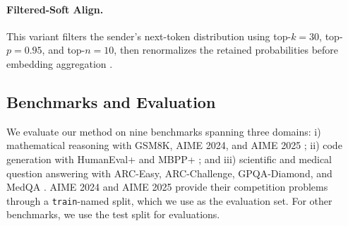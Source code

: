 \documentclass[11pt]{article}
\begin{document}
\paragraph{Filtered-Soft Align.}
This variant filters the sender's next-token distribution using top-$k=30$, top-$p=0.95$, and top-$n=10$, then renormalizes the retained probabilities before embedding aggregation \citep{soft_thinking}.

\subsection{Benchmarks and Evaluation}
We evaluate our method on nine benchmarks spanning three domains: i) mathematical reasoning with GSM8K, AIME 2024, and AIME 2025 \citep{gsm8k,aime2024,aime2025}; ii) code generation with HumanEval+ and MBPP+ \citep{evalplus}; and iii) scientific and medical question answering with ARC-Easy, ARC-Challenge, GPQA-Diamond, and MedQA \citep{arc,gpqa,medqa}. AIME 2024 and AIME 2025 provide their competition problems through a \texttt{train}-named split, which we use as the evaluation set. For other benchmarks, we use the test split for evaluations.
\end{document}
